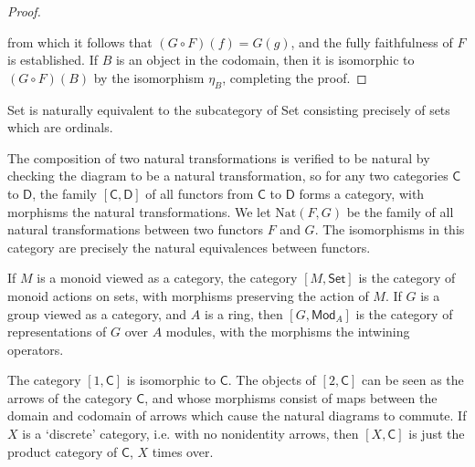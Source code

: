 \begin{proof}
    \begin{center}
    \end{center}
    from which it follows that $(G \circ F)(f) = G(g)$, and the fully faithfulness of $F$ is established. If $B$ is an object in the codomain, then it is isomorphic to $(G \circ F)(B)$ by the isomorphism $\eta_B$, completing the proof.
\end{proof}

\begin{example}
    {\sf Set} is naturally equivalent to the subcategory of {\sf Set} consisting precisely of sets which are ordinals.
\end{example}

The composition of two natural transformations is verified to be natural by checking the diagram to be a natural transformation, so for any two categories $\mathsf{C}$ to $\mathsf{D}$, the family $[\mathsf{C},\mathsf{D}]$ of all functors from $\mathsf{C}$ to $\mathsf{D}$ forms a category, with morphisms the natural transformations. We let $\text{Nat}(F,G)$ be the family of all natural transformations between two functors $F$ and $G$. The isomorphisms in this category are precisely the natural equivalences between functors.

\begin{example}
    If $M$ is a monoid viewed as a category, the category $[M,\textsf{Set}]$ is the category of monoid actions on sets, with morphisms preserving the action of $M$. If $G$ is a group viewed as a category, and $A$ is a ring, then $[G,\textsf{Mod}_A]$ is the category of representations of $G$ over $A$ modules, with the morphisms the intwining operators.
\end{example}

\begin{example}
    The category $[1,\mathsf{C}]$ is isomorphic to $\mathsf{C}$. The objects of $[2,\mathsf{C}]$ can be seen as the arrows of the category $\mathsf{C}$, and whose morphisms consist of maps between the domain and codomain of arrows which cause the natural diagrams to commute. If $X$ is a `discrete' category, i.e. with no nonidentity arrows, then $[X,\mathsf{C}]$ is just the product category of $\mathsf{C}$, $X$ times over.
\end{example}

